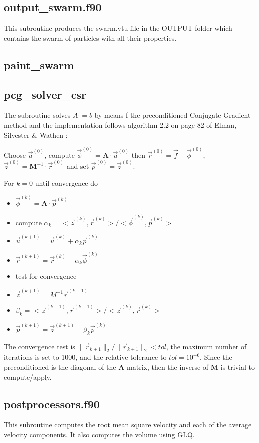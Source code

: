  \subsection{output\_swarm.f90}
 This subroutine produces the {\filenamefont swarm.vtu} file in the 
 {\foldernamefont OUTPUT} folder which contains the 
 swarm of particles with all their properties.
 \subsection{paint\_swarm}
 
 \subsection{pcg\_solver\_csr}
 The subroutine solves $A\cdot = b$ by means f the preconditioned Conjugate Gradient method
 and the implementation follows algorithm 2.2 on page 82 of Elman, Silvester \&
 Wathen \cite{elsw}:
 
 Choose ${\vec u}^{(0)}$, compute ${\vec \phi}^{(0)}={\bm A}\cdot {\vec u}^{(0)}$ 
 then ${\vec r}^{(0)}={\vec f}-{\vec \phi}^{(0)}$, 
 ${\vec z}^{(0)}={\bm M}^{-1}\cdot {\vec r}^{(0)}$ and set ${\vec p}^{(0)}={\vec z}^{(0)}$.
 
 For $k=0$ until convergence do
 \begin{itemize}
 \item ${\vec \phi}^{(k)}={\bm A}\cdot {\vec p}^{(k)}$
 \item compute $\alpha_k = <{\vec z}^{(k)},{\vec r}^{(k)}>/<{\vec \phi}^{(k)},{\vec p}^{(k)}>$
 \item ${\vec u}^{(k+1)}={\vec u}^{(k)}+\alpha_k {\vec p}^{(k)}$
 \item ${\vec r}^{(k+1)}={\vec r}^{(k)}-\alpha_k{\vec \phi}^{(k)}$
 \item test for convergence
 \item ${\vec z}^{(k+1)}=M^{-1} {\vec r}^{(k+1)}$
 \item $\beta_k= <{\vec z}^{(k+1)},{\vec r}^{(k+1)}>/<{\vec z}^{(k)},{\vec r}^{(k)}>$
 \item ${\vec p}^{(k+1)}={\vec z}^{(k+1)}+\beta_k {\vec p}^{(k)}$
 \end{itemize}
 The convergence test is $\| \vec{r}_{k+1} \|_2/ \| \vec{r}_{k+1} \|_2 < tol$, 
 the maximum number of iterations is set to 1000, and the relative tolerance to $tol=10^{-6}$.
 Since the preconditioned is the diagonal of the ${\bm A}$ matrix, then the inverse of 
 ${\bm M}$ is trivial to compute/apply. 
 \subsection{postprocessors.f90}
 This subroutine computes the root mean square velocity
 and each of the average velocity components. It also 
 computes the volume using GLQ.

